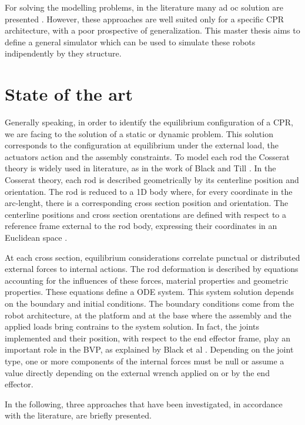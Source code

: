 \documentclass{thesisreport}
\begin{document}
 For solving the modelling problems, in the literature many ad oc solution are presented \cite{till_efficient_2015}\cite{black_parallel_2018}\cite{till_real-time_2019}. However, these approaches are well suited only for a specific CPR architecture, with a poor prospective of generalization. This master thesis aims to define a general simulator which can be used to simulate these robots indipendently by they structure. 
 
 \chapter{State of the art}
 Generally speaking, in order to identify the equilibrium configuration of a CPR, we are facing to the solution of a static or dynamic problem. This solution corresponds to the configuration at equilibrium under the external load, the actuators action and the assembly constraints. To model each rod the Cosserat theory is widely used in literature, as in the work of Black \cite{black_modeling_2017}\cite{black_parallel_2018} and Till \cite{till_efficient_2015}\cite{till_real-time_2019}. In the Cosserat theory, each rod is described geometrically by its centerline position and orientation. The rod is reduced to a 1D body where, for every coordinate in the arc-lenght, there is a corresponding cross section position and orientation. The centerline positions and cross section orentations are defined with respect to a reference frame external to the rod body, expressing their coordinates in an Euclidean space \cite{selig_geometric_2005}.
  
 At each cross section, equilibrium considerations correlate punctual or distributed external forces to internal actions. The rod deformation is described by equations accounting for the influences of these forces, material properties and geometric properties. These equations define a ODE system. This system solution depends on the boundary and initial conditions. The boundary conditions come from the robot architecture, at the platform and at the base where the assembly and the applied loads bring contrains to the system solution. In fact, the joints implemented and their position, with respect to the end effector frame, play an important role in the BVP, as explained by Black et al \cite{black_parallel_2018}. Depending on the joint type, one or more components of the internal forces must be null or assume a value directly depending on the external wrench applied on or by the end effector.  
 
 In the following, three approaches that have been investigated, in accordance with the literature, are briefly presented.
 
\end{document}
